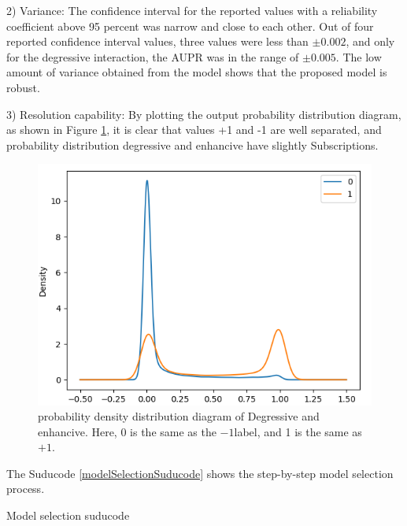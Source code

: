 \documentclass{bmcart}
\begin{document}
2) Variance: The confidence interval for the reported values with a reliability coefficient above 95 percent was narrow and close to each other. Out of four reported confidence interval values, three values were less than $\pm 0.002$, and only for the degressive interaction, the AUPR was in the range of $\pm 0.005$. The low amount of variance obtained from the model shows that the proposed model is robust.

3) Resolution capability: By plotting the output probability distribution diagram, as shown in Figure \ref{DDIProbHist}, it is clear that values +1 and -1 are well separated, and probability distribution degressive and enhancive have slightly Subscriptions.

\begin{figure}[!h]
	\centering
	\includegraphics[scale=0.5]{ModelSelection/densityDegEnh.png}
	\caption{probability density distribution diagram of Degressive and enhancive. Here, 0 is the same as the $-1$label, and 1 is the same as $+1$.}
	\label{DDIProbHist}
\end{figure}

The Suducode \ref{modelSelectionSuducode} shows the step-by-step model selection process.

\renewcommand{\algorithmicrequire}{\textbf{Input:}}
\renewcommand{\algorithmicensure}{\textbf{Output:}}
\begin{algorithm}[!h]
\caption{Model selection suducode}
\label{modelSelectionSuducode}
\end{algorithm}
\end{document}
